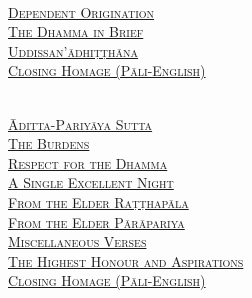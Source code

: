 {  \clearpage

  {\libertinusFont\selectfont\textbf{\textsc{\fontsize{18}{12}\selectfont{}}}}\\

  \textsc{\fontsize{14.4}{28}\selectfont
    \hyperref[dependent-origination]{Dependent Origination} \ifdesktopversion\else\pageref{dependent-origination}\fi\\
    \hyperref[dhamma-in-brief]{The Dhamma in Brief} \ifdesktopversion\else\pageref{dhamma-in-brief}\fi\\
    \hyperref[uddissanadhitthana]{Uddissan'ādhiṭṭhāna} \ifdesktopversion\else\pageref{uddissanadhitthana}\fi\\
    \hyperref[closing-homage]{Closing Homage (Pāli-English)} \ifdesktopversion\else\pageref{closing-homage}\fi\\
  }

  \vspace{1.0cm}

  {\libertinusFont\selectfont\textbf{\textsc{\fontsize{18}{12}\selectfont{}}}}\\

  \textsc{\fontsize{14.4}{28}\selectfont
    \hyperref[aditta-pariyaya]{Āditta-Pariyāya Sutta} \ifdesktopversion\else\pageref{aditta-pariyaya}\fi\\
    \hyperref[burdens]{The Burdens} \ifdesktopversion\else\pageref{burdens}\fi\\
    \hyperref[respect-for-the-dhamma]{Respect for the Dhamma} \ifdesktopversion\else\pageref{respect-for-the-dhamma}\fi\\
    \hyperref[single-excellent-night]{A Single Excellent Night} \ifdesktopversion\else\pageref{single-excellent-night}\fi\\
    \hyperref[ratthapala]{From the Elder Raṭṭhapāla}  \ifdesktopversion\else\pageref{ratthapala}\fi\\
    \hyperref[parapariya]{From the Elder Pārāpariya} \ifdesktopversion\else\pageref{parapariya}\fi\\
    \hyperref[misc-verses]{Miscellaneous Verses} \ifdesktopversion\else\pageref{misc-verses}\fi\\
    \hyperref[highest-honour-aspirations]{The Highest Honour and Aspirations} \ifdesktopversion\else\pageref{highest-honour-aspirations}\fi\\
    \hyperref[closing-homage]{Closing Homage (Pāli-English)} \ifdesktopversion\else\pageref{closing-homage}\fi\\
  }

}

